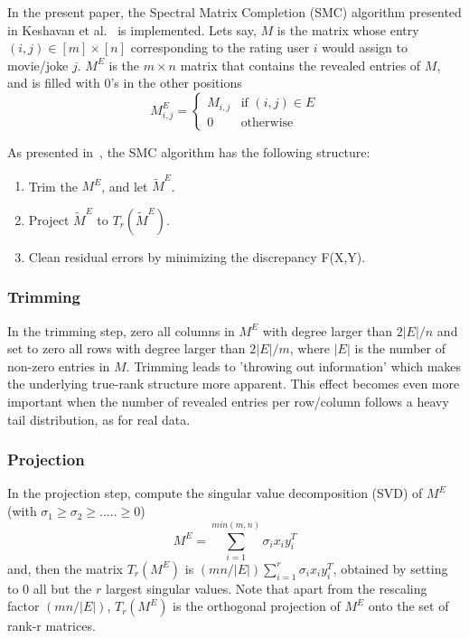 In the present paper, the Spectral Matrix Completion (SMC) algorithm presented in Keshavan et al.~\cite{keshavan2010matrix} is implemented. Lets say, $M$ is the matrix whose entry $(i,j) \in [m] \times [n]$ corresponding to the rating user $i$ would assign to movie/joke $j$. $M^E$ is the $m \times n$ matrix that contains the revealed entries of $M$, and is filled with 0's in the other positions 
\begin{equation}
M^E_{i,j} = \left \{ \begin{array}{rcl}
	M_{i,j} & \mbox{if  }  (i,j) \in E \\
	 0 & \mbox{otherwise} 
	\end{array} \right.
\end{equation}

As presented in~\cite{keshavan2010matrix}, the SMC algorithm has the following structure:
\begin{enumerate}
\item Trim the $M^E$, and let $\widetilde{M}^E$.
\item Project $\widetilde{M}^E$ to $T_r(\widetilde{M}^E)$.
\item Clean residual errors by minimizing the discrepancy F(X,Y).
\end{enumerate}

\subsubsection{Trimming}
In the trimming step, zero all columns in $M^E$ with degree larger than $2|E|/n$ and set to zero all rows with degree larger than $2|E|/m$, where $|E|$ is the number of non-zero entries in $M$. Trimming leads to 'throwing out information' which makes the underlying true-rank structure more apparent. This effect becomes even more important when the number
of revealed entries per row/column follows a heavy tail distribution, as for real data.

\subsubsection{Projection}
In the projection step, compute the singular value decomposition (SVD) of $M^E$ (with $\sigma_1 \ge \sigma_2 \ge .....\ge 0$)
\begin{equation}
M^E = \sum\limits_{i=1}^{min(m,n)} \sigma_ix_iy_i^T
\end{equation}
and, then the matrix $T_r(M^E)$ is $(mn/|E|)\sum\limits_{i=1}^r \sigma_ix_iy_i^T$, obtained by setting to 0 all but the $r$ largest singular values. Note that apart from the rescaling factor $(mn/|E|)$, $T_r(M^E)$ is the orthogonal projection of $M^E$ onto the set of rank-r matrices. 

